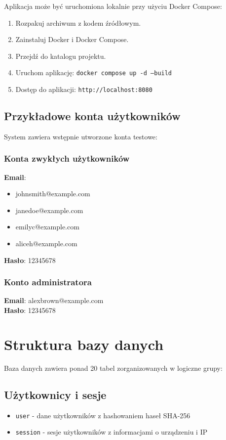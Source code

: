 Aplikacja może być uruchomiona lokalnie przy użyciu Docker Compose:

\begin{enumerate}
    \item Rozpakuj archiwum z kodem źródłowym.
    \item Zainstaluj Docker i Docker Compose.
    \item Przejdź do katalogu projektu.
    \item Uruchom aplikację: \texttt{docker compose up -d --build}
    \item Dostęp do aplikacji: \texttt{http://localhost:8080}
\end{enumerate}

\subsection*{Przykładowe konta użytkowników}

System zawiera wstępnie utworzone konta testowe:

\subsubsection*{Konta zwykłych użytkowników}
\textbf{Email}: 
\begin{itemize}
    \item johnsmith@example.com
    \item janedoe@example.com  
    \item emilyc@example.com
    \item aliceh@example.com
\end{itemize}
\textbf{Hasło}: 12345678

\subsubsection*{Konto administratora}
\textbf{Email}: alexbrown@example.com \\
\textbf{Hasło}: 12345678

\section*{Struktura bazy danych}

Baza danych zawiera ponad 20 tabel zorganizowanych w logiczne grupy:

\subsection*{Użytkownicy i sesje}
\begin{itemize}
    \item \texttt{user} - dane użytkowników z hashowaniem haseł SHA-256
    \item \texttt{session} - sesje użytkowników z informacjami o urządzeniu i IP
\end{itemize}

